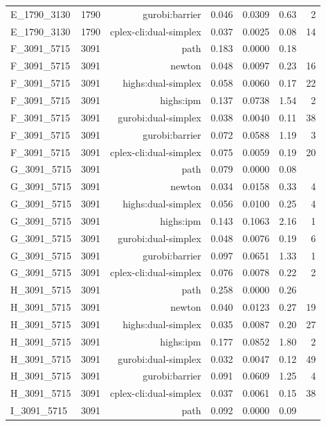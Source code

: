 \begin{longtable}{lrrrrrr}
E\_1790\_3130 & 1790 & gurobi:barrier & 0.046 & 0.0309 & 0.63 & 2 \\
E\_1790\_3130 & 1790 & cplex-cli:dual-simplex & 0.037 & 0.0025 & 0.08 & 14 \\
F\_3091\_5715 & 3091 & path & 0.183 & 0.0000 & 0.18 &  \\
F\_3091\_5715 & 3091 & newton & 0.048 & 0.0097 & 0.23 & 16 \\
F\_3091\_5715 & 3091 & highs:dual-simplex & 0.058 & 0.0060 & 0.17 & 22 \\
F\_3091\_5715 & 3091 & highs:ipm & 0.137 & 0.0738 & 1.54 & 2 \\
F\_3091\_5715 & 3091 & gurobi:dual-simplex & 0.038 & 0.0040 & 0.11 & 38 \\
F\_3091\_5715 & 3091 & gurobi:barrier & 0.072 & 0.0588 & 1.19 & 3 \\
F\_3091\_5715 & 3091 & cplex-cli:dual-simplex & 0.075 & 0.0059 & 0.19 & 20 \\
G\_3091\_5715 & 3091 & path & 0.079 & 0.0000 & 0.08 &  \\
G\_3091\_5715 & 3091 & newton & 0.034 & 0.0158 & 0.33 & 4 \\
G\_3091\_5715 & 3091 & highs:dual-simplex & 0.056 & 0.0100 & 0.25 & 4 \\
G\_3091\_5715 & 3091 & highs:ipm & 0.143 & 0.1063 & 2.16 & 1 \\
G\_3091\_5715 & 3091 & gurobi:dual-simplex & 0.048 & 0.0076 & 0.19 & 6 \\
G\_3091\_5715 & 3091 & gurobi:barrier & 0.097 & 0.0651 & 1.33 & 1 \\
G\_3091\_5715 & 3091 & cplex-cli:dual-simplex & 0.076 & 0.0078 & 0.22 & 2 \\
H\_3091\_5715 & 3091 & path & 0.258 & 0.0000 & 0.26 &  \\
H\_3091\_5715 & 3091 & newton & 0.040 & 0.0123 & 0.27 & 19 \\
H\_3091\_5715 & 3091 & highs:dual-simplex & 0.035 & 0.0087 & 0.20 & 27 \\
H\_3091\_5715 & 3091 & highs:ipm & 0.177 & 0.0852 & 1.80 & 2 \\
H\_3091\_5715 & 3091 & gurobi:dual-simplex & 0.032 & 0.0047 & 0.12 & 49 \\
H\_3091\_5715 & 3091 & gurobi:barrier & 0.091 & 0.0609 & 1.25 & 4 \\
H\_3091\_5715 & 3091 & cplex-cli:dual-simplex & 0.037 & 0.0061 & 0.15 & 38 \\
I\_3091\_5715 & 3091 & path & 0.092 & 0.0000 & 0.09 &  \\

\end{longtable}
